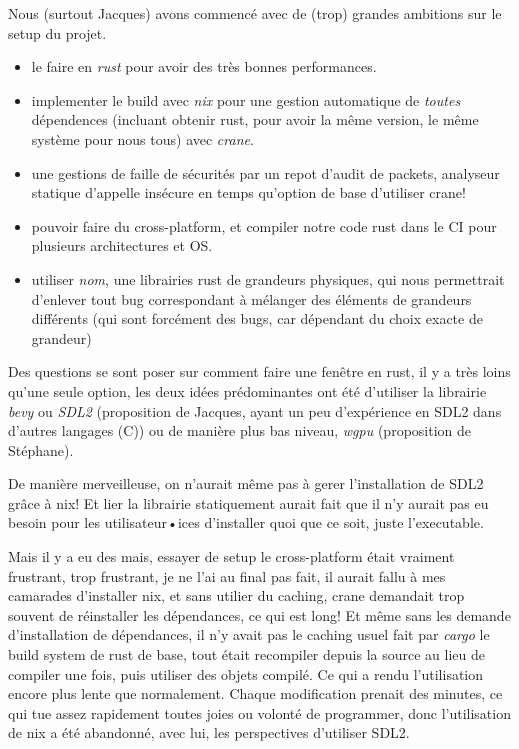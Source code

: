 \documentclass{article}
\begin{document}
Nous (surtout Jacques) avons commencé avec de (trop) grandes ambitions sur le setup du projet.

\begin{itemize}
    \item le faire en {\emph {rust}} pour avoir des très bonnes performances.
    \item implementer le build avec {\emph {nix}} pour une gestion automatique de {\emph {toutes}} dépendences (incluant obtenir rust, pour avoir la même version, le même système pour nous tous) avec {\emph {crane}}.
    \item une gestions de faille de sécurités par un repot d'audit de packets, analyseur statique d'appelle insécure en temps qu'option de base d'utiliser crane!
    \item pouvoir faire du cross-platform, et compiler notre code rust dans le CI pour plusieurs architectures et OS.
    \item utiliser {\emph {nom}}, une librairies rust de grandeurs physiques, qui nous permettrait d'enlever tout bug correspondant à mélanger des éléments de grandeurs différents (qui sont forcément des bugs, car dépendant du choix exacte de grandeur)
\end{itemize}

Des questions se sont poser sur comment faire une fenêtre en rust, il y a très loins qu'une seule option, les deux idées prédominantes ont été d'utiliser la librairie {\emph {bevy}} ou {\emph {SDL2}} (proposition de Jacques, ayant un peu d'expérience en SDL2 dans d'autres langages (C)) ou de manière plus bas niveau, {\emph {wgpu}} (proposition de Stéphane).

De manière merveilleuse, on n'aurait même pas à gerer l'installation de SDL2 grâce à nix! Et lier la librairie statiquement aurait fait que il n'y aurait pas eu besoin pour les utilisateur•ices d'installer quoi que ce soit, juste l'executable.

Mais il y a eu des mais, essayer de setup le cross-platform était vraiment frustrant, trop frustrant, je ne l'ai au final pas fait, il aurait fallu à mes camarades d'installer nix, et sans utilier du caching, crane demandait trop souvent de réinstaller les dépendances, ce qui est long! Et même sans les demande d'installation de dépendances, il n'y avait pas le caching usuel fait par {\emph {cargo}} le build system de rust de base, tout était recompiler depuis la source au lieu de compiler une fois, puis utiliser des objets compilé. Ce qui a rendu l'utilisation encore plus lente que normalement. Chaque modification prenait des minutes, ce qui tue assez rapidement toutes joies ou volonté de programmer, donc l'utilisation de nix a été abandonné, avec lui, les perspectives d'utiliser SDL2.
\end{document}
